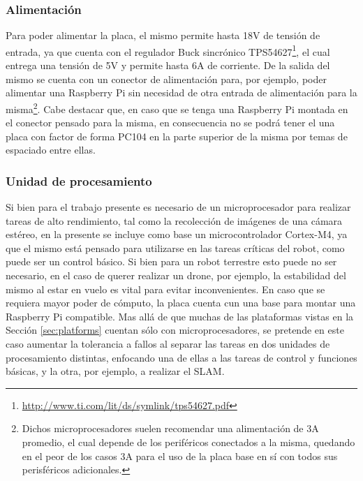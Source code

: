 \subsubsection{Alimentación}
Para poder alimentar la placa, el mismo permite hasta 18V de tensión de entrada, ya que cuenta con el regulador Buck sincrónico TPS54627\footnote{\url{http://www.ti.com/lit/ds/symlink/tps54627.pdf}}, el cual entrega una tensión de 5V y permite hasta 6A de corriente. De la salida del mismo se cuenta con un conector de alimentación para, por ejemplo, poder alimentar una Raspberry Pi sin necesidad de otra entrada de alimentación para la misma\footnote{Dichos microprocesadores suelen recomendar una alimentación de 3A promedio, el cual depende de los periféricos conectados a la misma, quedando en el peor de los casos 3A para el uso de la placa base en sí con todos sus perisféricos adicionales.}. Cabe destacar que, en caso que se tenga una Raspberry Pi montada en el conector pensado para la misma, en consecuencia no se podrá tener el una placa con factor de forma PC104 en la parte superior de la misma por temas de espaciado entre ellas.

\subsubsection{Unidad de procesamiento}
Si bien para el trabajo presente es necesario de un microprocesador para realizar tareas de alto rendimiento, tal como la recolección de imágenes de una cámara estéreo, en la presente se incluye como base un microcontrolador Cortex-M4, ya que el mismo está pensado para utilizarse en las tareas críticas del robot, como puede ser un control básico. Si bien para un robot terrestre esto puede no ser necesario, en el caso de querer realizar un drone, por ejemplo, la estabilidad del mismo al estar en vuelo es vital para evitar inconvenientes. En caso que se requiera mayor poder de cómputo, la placa cuenta cun una base para montar una Raspberry Pi compatible. Mas allá de que muchas de las plataformas vistas en la Sección \ref{sec:platforms} cuentan sólo con microprocesadores, se pretende en este caso aumentar la tolerancia a fallos al separar las tareas en dos unidades de procesamiento distintas, enfocando una de ellas a las tareas de control y funciones básicas, y la otra, por ejemplo, a realizar el SLAM.

